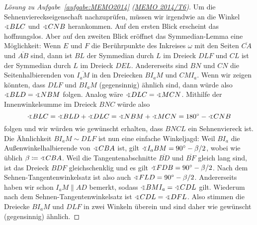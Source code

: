 \begin{proof}[Lösung zu Aufgabe~\ref{aufgabe:MEMO2014} \textmd{(\href{https://artofproblemsolving.com/community/c3587_2014_middle_european_mathematical_olympiad}{MEMO 2014/T6})}]
	Um die Sehnenviereckseigenschaft nachzuprüfen, müssen wir irgendwie an die Winkel $\winkel BLC$ und $\winkel CNB$ herankommen. Auf den ersten Blick erscheint das hoffnungslos. Aber auf den zweiten Blick eröffnet das Symmedian-Lemma eine Möglichkeit: Wenn $E$ und $F$ die Berührpunkte des Inkreises $\omega$ mit den Seiten $\overline{CA}$ und $\overline{AB}$ sind, dann ist $BL$ der Symmedian durch $L$ im Dreieck $DLF$ und $CL$ ist der Symmedian durch $L$ im Dreieck $DEL$. Andererseits sind $BN$ und $CN$ die Seitenhalbierenden von $\overline{I_aM}$ in den Dreiecken $BI_aM$ und $CMI_a$. Wenn wir zeigen könnten, dass $DLF$ und $BI_aM$ (gegensinnig) ähnlich sind, dann würde also $\winkel BLD=\winkel NBM$ folgen. Analog wäre $\winkel DLC=\winkel MCN$. Mithilfe der Innenwinkelsumme im Dreieck $BNC$ würde also
	\begin{equation*}
		\winkel BLC=\winkel BLD+\winkel DLC=\winkel NBM+\winkel MCN=180^\circ-\winkel CNB
	\end{equation*}
	folgen und wir würden wie gewünscht erhalten, dass $BNCL$ ein Sehnenviereck ist. Die Ähnlichkeit $BI_aM\sim DLF$ ist nun eine einfache Winkeljagd: Weil $BI_a$ die Außenwinkelhalbierende von $\winkel CBA$ ist, gilt $\winkel I_aBM=90^\circ-\beta/2$, wobei wie üblich $\beta\coloneqq \winkel CBA$. Weil die Tangentenabschnitte $\overline{BD}$ und $\overline{BF}$ gleich lang sind, ist das Dreieck $BDF$ gleichschenklig und es gilt $\winkel FDB=90^\circ-\beta/2$. Nach dem Sehnen-Tangentenwinkelsatz ist also auch $\winkel FLD=90^\circ-\beta/2$. Andererseits haben wir schon $I_aM\parallel AD$ bemerkt, sodass $\winkel BMI_a=\winkel CDL$ gilt. Wiederum nach dem Sehnen-Tangentenwinkelsatz ist $\winkel CDL=\winkel DFL$. Also stimmen die Dreiecke $BI_aM$ und $DLF$ in zwei Winkeln überein und sind daher wie gewünscht (gegensinnig) ähnlich.
\end{proof}

